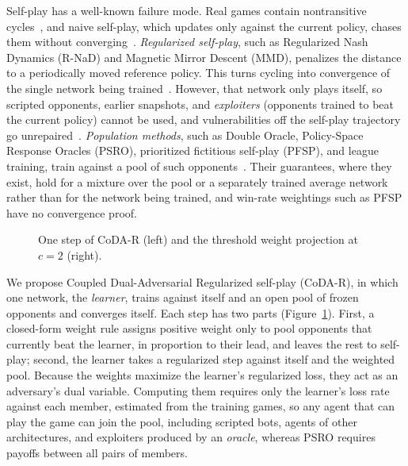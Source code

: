 \documentclass{article} %
\theoremstyle{plain}
\theoremstyle{remark}
\newcommand{\codar}{CoDA-R}
\begin{document}
Self-play has a well-known failure mode. Real games contain nontransitive cycles~\citep{czarnecki2020spinning}, and naive self-play, which updates only against the current policy, chases them without converging~\citep{balduzzi2018mechanics,balduzzi2019openended}. \emph{Regularized self-play}, such as Regularized Nash Dynamics (R-NaD) and Magnetic Mirror Descent (MMD), penalizes the distance to a periodically moved reference policy. This turns cycling into convergence of the single network being trained~\citep{perolat2021rnad,perolat2022stratego,sokota2023mmd}. However, that network only plays itself, so scripted opponents, earlier snapshots, and \emph{exploiters} (opponents trained to beat the current policy) cannot be used, and vulnerabilities off the self-play trajectory go unrepaired~\citep{openai2019dota,bansal2018emergent}. \emph{Population methods}, such as Double Oracle, Policy-Space Response Oracles (PSRO), prioritized fictitious self-play (PFSP), and league training, train against a pool of such opponents~\citep{mcmahan2003doubleoracle,lanctot2017psro,vinyals2019alphastar}. Their guarantees, where they exist, hold for a mixture over the pool or a separately trained average network rather than for the network being trained, and win-rate weightings such as PFSP have no convergence proof.

\begin{figure}[t]
\begin{center}

\end{center}
\vspace{-4pt}
\caption{One step of \codar{} (left) and the threshold weight projection at $c=2$ (right).}
\label{fig:overview}
\end{figure}

We propose Coupled Dual-Adversarial Regularized self-play (\codar{}), in which one network, the \emph{learner}, trains against itself and an open pool of frozen opponents and converges itself. Each step has two parts (Figure~\ref{fig:overview}). First, a closed-form weight rule assigns positive weight only to pool opponents that currently beat the learner, in proportion to their lead, and leaves the rest to self-play; second, the learner takes a regularized step against itself and the weighted pool. Because the weights maximize the learner's regularized loss, they act as an adversary's dual variable. Computing them requires only the learner's loss rate against each member, estimated from the training games, so any agent that can play the game can join the pool, including scripted bots, agents of other architectures, and exploiters produced by an \emph{oracle}, whereas PSRO requires payoffs between all pairs of members.
\end{document}
